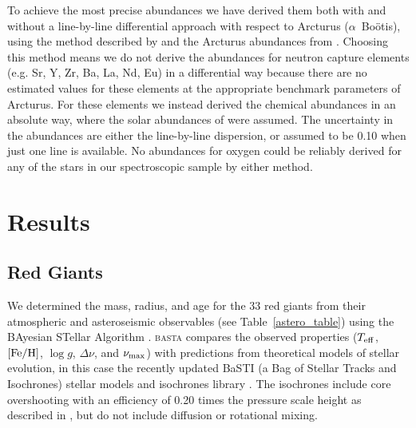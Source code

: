 \documentclass[modern]{aastex62}
\newcommand{\numax}{\mbox{$\nu_{\rm max}$}\xspace}
\newcommand{\Dnu}{\mbox{$\Delta \nu$}\xspace}
\newcommand{\teff}{\mbox{$T_{\rm eff}$}\xspace}
\newcommand{\logg}{\mbox{$\log g$}\xspace}
\newcommand{\feh}{\mbox{$\rm{[Fe/H]}$}\xspace}
\begin{document}
To achieve the most precise abundances we have derived them both with and without a line-by-line differential approach with respect to Arcturus ($\alpha$~Bo\"{o}tis), using the method described by \citet{hawkinsapogee} and the Arcturus abundances from \citet{gaiabenchmark4}. Choosing this method means we do not derive the abundances for neutron capture  elements (e.g. Sr, Y, Zr, Ba, La, Nd, Eu) in a differential way because there are no estimated values for these elements at the appropriate benchmark parameters of Arcturus. For these elements we instead derived the chemical abundances in an absolute way, where the solar abundances of \cite{Asplund2005} were assumed. The uncertainty in the abundances are either the line-by-line dispersion, or assumed to be 0.10 when just one line is available. No abundances for oxygen could be reliably derived for any of the stars in our spectroscopic sample by either method.





\section{Results}
\label{targets}

\subsection{Red Giants}
\label{rgs}

We determined the mass, radius, and age for the 33 red giants from their atmospheric and asteroseismic observables (see Table~\ref{astero_table}) using the BAyesian STellar Algorithm \citep[\textsc{basta}][]{silvaaguirre2015,silvaaguirre2017}. \textsc{basta} compares the observed properties (\teff, \feh, \logg, \Dnu, and \numax) with predictions from theoretical models of stellar evolution, in this case the recently updated BaSTI (a Bag of Stellar Tracks and Isochrones) stellar models and isochrones library \citep{Hidalgo:2018dy}. The isochrones include core overshooting with an efficiency of 0.20 times the pressure scale height as described in \citet{Hidalgo:2018dy}, but do not include diffusion or rotational mixing.
\end{document}
